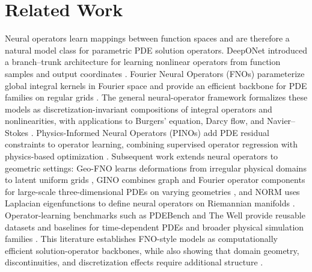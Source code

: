 \section{Related Work}
\label{sec:related}

Neural operators learn mappings between function spaces and are therefore a natural model class for parametric PDE solution operators. DeepONet introduced a branch--trunk architecture for learning nonlinear operators from function samples and output coordinates \citep{lu2021deeponet}. Fourier Neural Operators (FNOs) parameterize global integral kernels in Fourier space and provide an efficient backbone for PDE families on regular grids \citep{li2021fno}. The general neural-operator framework formalizes these models as discretization-invariant compositions of integral operators and nonlinearities, with applications to Burgers' equation, Darcy flow, and Navier--Stokes \citep{kovachki2023neuraloperator}. Physics-Informed Neural Operators (PINOs) add PDE residual constraints to operator learning, combining supervised operator regression with physics-based optimization \citep{li2024pino}. Subsequent work extends neural operators to geometric settings: Geo-FNO learns deformations from irregular physical domains to latent uniform grids \citep{li2023geofno}, GINO combines graph and Fourier operator components for large-scale three-dimensional PDEs on varying geometries \citep{li2023gino}, and NORM uses Laplacian eigenfunctions to define neural operators on Riemannian manifolds \citep{chen2024norm}. Operator-learning benchmarks such as PDEBench and The Well provide reusable datasets and baselines for time-dependent PDEs and broader physical simulation families \citep{takamoto2022pdebench,ohana2024well}. This literature establishes FNO-style models as computationally efficient solution-operator backbones, while also showing that domain geometry, discontinuities, and discretization effects require additional structure \citep{lanthaler2023discontinuous}.

